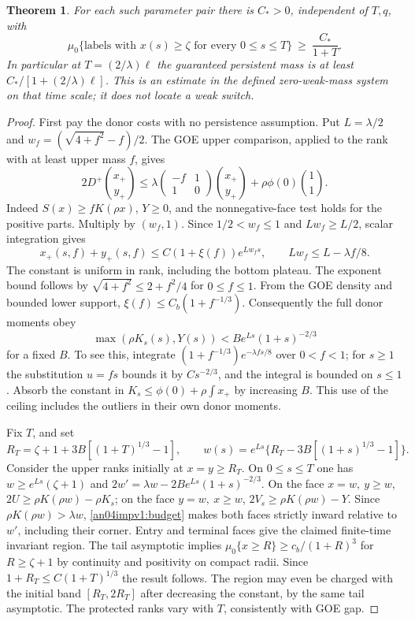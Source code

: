 \documentclass[11pt]{article}
\newtheorem{theorem}{Theorem}\newtheorem{lemma}{Lemma}
\begin{document}
\begin{theorem}\label{an04impv1:mass}
For each such parameter pair there is \(C_*>0\), independent of
\(T,q\), with
\[
 \mu_0\{\text{labels with }x(s)\ge\zeta\text{ for every }0\le s\le T\}
 \ \ge\ \frac{C_*}{1+T}.
\]
In particular at \(T=(2/\lambda)\ell\) the guaranteed persistent mass
is at least \(C_* /[1+(2/\lambda)\ell]\). This is an estimate in the
defined zero-weak-mass system on that time scale; it does not locate
a weak switch.
\end{theorem}
\begin{proof}
First pay the donor costs with no persistence assumption. Put
\(L=\lambda/2\) and \(w_f=(\sqrt{4+f^2}-f)/2\).
The GOE upper comparison, applied to the rank with at least upper mass
\(f\), gives
\[
 2D^+\binom{x_+}{y_+}\le
 \lambda\begin{pmatrix}-f&1\\1&0\end{pmatrix}\binom{x_+}{y_+}
 +\rho\phi(0)\binom11 .
\]
Indeed \(S(x)\ge f K(\rho x)\), \(Y\ge0\), and the nonnegative-face
test holds for the positive parts. Multiply by \((w_f,1)\).
Since \(1/2<w_f\le1\) and \(L w_f\ge L/2\), scalar integration gives
\[
 x_+(s,f)+y_+(s,f)\le C(1+\xi(f))e^{Lw_fs},\qquad
 Lw_f\le L-\lambda f/8.
\]
The constant is uniform in rank, including the bottom plateau.
The exponent bound follows by \(\sqrt{4+f^2}\le2+f^2/4\) for
\(0\le f\le1\). From the GOE density and bounded lower support,
\(\xi(f)\le C_b(1+f^{-1/3})\). Consequently the full donor moments obey
\begin{equation}
 \max(\rho K_s(s),Y(s))<B e^{Ls}(1+s)^{-2/3}
 \label{an04impv1:budget}
\end{equation}
for a fixed \(B\). To see this, integrate
\((1+f^{-1/3})e^{-\lambda fs/8}\) over \(0<f<1\); for \(s\ge1\)
the substitution \(u=fs\) bounds it by \(Cs^{-2/3}\), and the
integral is bounded on \(s\le1\). Absorb the constant in
\(K_s\le\phi(0)+\rho\int x_+\) by increasing \(B\).
This use of the ceiling includes the outliers in their own donor moments.

Fix \(T\), and set
\[
 R_T=\zeta+1+3B[(1+T)^{1/3}-1],\qquad
 w(s)=e^{Ls}\{R_T-3B[(1+s)^{1/3}-1]\}.
\]
Consider the upper ranks initially at \(x=y\ge R_T\). On
\(0\le s\le T\) one has \(w\ge e^{Ls}(\zeta+1)\) and
\(2w'=\lambda w-2B e^{Ls}(1+s)^{-2/3}\).
On the face \(x=w,\ y\ge w\),
\(2U\ge\rho K(\rho w)-\rho K_s\); on the face \(y=w,\ x\ge w\),
\(2V_s\ge\rho K(\rho w)-Y\). Since \(\rho K(\rho w)>\lambda w\),
\eqref{an04impv1:budget} makes both faces strictly inward relative
to \(w'\), including their corner. Entry and terminal faces give
the claimed finite-time invariant region. The tail asymptotic implies
\(\mu_0\{x\ge R\}\ge c_b/(1+R)^3\) for \(R\ge\zeta+1\) by continuity
and positivity on compact radii. Since \(1+R_T\le C(1+T)^{1/3}\)
the result follows. The region may even be charged with the initial
band \([R_T,2R_T]\) after decreasing the constant, by the same tail
asymptotic. The protected ranks vary with \(T\), consistently with GOE gap.
\end{proof}
\end{document}
